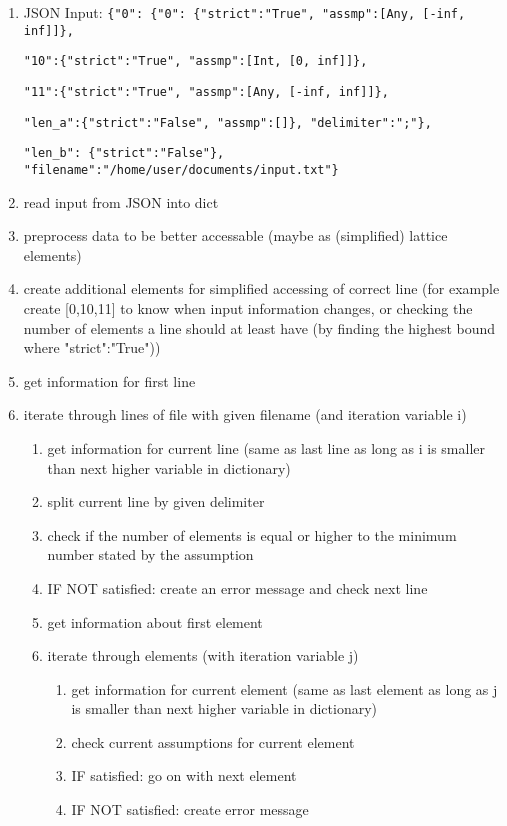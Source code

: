 \documentclass[11pt]{article}
\begin{document}
\begin{enumerate}
\item JSON Input: \verb|{"0": {"0": {"strict":"True", "assmp":[Any, [-inf, inf]]}, |

\verb|"10":{"strict":"True", "assmp":[Int, [0, inf]]}, |

\verb|"11":{"strict":"True", "assmp":[Any, [-inf, inf]]}, |

\verb|"len_a":{"strict":"False", "assmp":[]}, "delimiter":";"}, |

\verb|"len_b": {"strict":"False"}, "filename":"/home/user/documents/input.txt"}|
\item read input from JSON into dict
\item preprocess data to be better accessable (maybe as (simplified) lattice elements)
\item create additional elements for simplified accessing of correct line (for example create [0,10,11] to know when input information changes, or checking the number of elements a line should at least have (by finding the highest bound where "strict":"True"))
\item get information for first line
\item iterate through lines of file with given filename (and iteration variable i)
\begin{enumerate}
\item get information for current line (same as last line as long as i is smaller than next higher variable in dictionary)
\item split current line by given delimiter
\item check if the number of elements is equal or higher to the minimum number stated by the assumption
\item IF NOT satisfied: create an error message and check next line
\item get information about first element
\item iterate through elements (with iteration variable j)
\begin{enumerate}
\item get information for current element (same as last element as long as j is smaller than next higher variable in dictionary)
\item check current assumptions for current element
\item IF satisfied: go on with next element
\item IF NOT satisfied: create error message
\end{enumerate}
\end{enumerate}
\end{enumerate}
\end{document}
